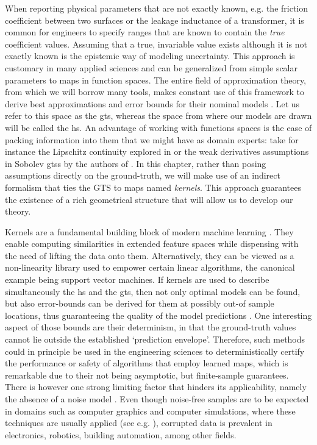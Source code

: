 When reporting physical parameters that are not exactly known, e.g. the friction coefficient between two surfaces or the leakage inductance of a transformer, it is common for engineers to specify ranges that are known to contain the \textit{true} coefficient values. Assuming that a true, invariable value exists although it is not exactly known is the epistemic way of modeling uncertainty. This approach is customary in many applied sciences and can be generalized from simple scalar parameters to maps in function spaces. The entire field of approximation theory, from which we will borrow many tools, makes constant use of this framework to derive best approximations and error bounds for their nominal models \citep{wendland2004scattered,iske2018approximation}.  Let us refer to this space as the \ac{gts}, whereas the space from where our models are drawn will be called the \ac{hs}. An advantage of working with functions spaces is the ease of packing information into them that we might have as domain experts: take for instance the Lipschitz continuity explored in  \cite{milanese2004set,sabug2021smgo} or the weak derivatives assumptions in Sobolev \acp{gts} by the authors of \cite{novara2022nonlinear}. In this chapter, rather than posing assumptions directly on the ground-truth, we will make use of an indirect formalism that ties the GTS to maps named \textit{kernels}. This approach guarantees the existence of a rich geometrical structure that will allow us to develop our theory.

Kernels are a fundamental building block of modern machine learning \citep{scholkopf2002learning}. They enable computing similarities in extended feature spaces while dispensing with the need of lifting the data onto them. Alternatively, they can be viewed as a non-linearity library used to empower certain linear algorithms, the canonical example being support vector machines. If kernels are used to describe simultaneously the \ac{hs} and the \ac{gts}, then not only optimal models can be found, but also error-bounds can be derived for them at possibly out-of sample locations, thus guaranteeing the quality of the model predictions \citep{schaback2006kernel,kanagawa2018gaussian}. One interesting aspect of those bounds are their determinism, in that the ground-truth values cannot lie outside the established ‘prediction envelope’. Therefore, such methods could in principle be used in the engineering sciences to deterministically certify the performance or safety of algorithms that employ learned maps, which is remarkable due to their not being asymptotic, but finite-sample guarantees. There is however one strong limiting factor that hinders its applicability, namely the absence of a noise model \citep[§11]{wendland2004scattered}. Even though noise-free samples are to be expected in domains such as computer graphics and  computer simulations, where these techniques are usually applied  (see e.g. \citep{sarra2005adaptive,nikan2022numerical}), corrupted data is prevalent in electronics, robotics, building automation, among other fields. 

